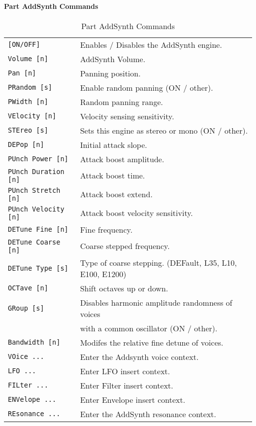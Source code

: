 \paragraph{Part AddSynth Commands}
\label{paragraph:command_line_part_addsynth_commands}
   \begin{table}[H]
      \centering
      \caption{Part AddSynth Commands}
      \label{table:yoshimi_part_addsynth_commands}
      \begin{tabular}{l l}
\texttt{[ON/OFF]} &
   Enables / Disables the AddSynth engine. \\
\texttt{Volume [n]} &
   AddSynth Volume.  \\
\texttt{Pan [n]} &
   Panning position.\\
\texttt{PRandom [s]} &
   Enable random panning (ON / other).\\
\texttt{PWidth [n]} &
   Random panning range.\\
\texttt{VElocity [n]} &
   Velocity sensing sensitivity. \\
\texttt{STEreo [s]} &
   Sets this engine as stereo or mono (ON / other). \\
\texttt{DEPop [n]} &
   Initial attack slope.   \\
\texttt{PUnch Power [n]} &
   Attack boost amplitude. \\
\texttt{PUnch Duration [n]} &
   Attack boost time.   \\
\texttt{PUnch Stretch [n]} &
   Attack boost extend. \\
\texttt{PUnch Velocity [n]} &
   Attack boost velocity sensitivity.  \\
\texttt{DETune Fine [n]} &
   Fine frequency.   \\
\texttt{DETune Coarse [n]} &
   Coarse stepped frequency.  \\
\texttt{DETune Type [s]} &
   Type of coarse stepping. (DEFault, L35, L10, E100, E1200)  \\
\texttt{OCTave [n]} &
   Shift octaves up or down.  \\
\texttt{GRoup [s]} &
   Disables harmonic amplitude randomness of voices \\
\texttt{ } &
             with a common oscillator (ON / other). \\
\texttt{Bandwidth [n]} &
   Modifes the relative fine detune of voices. \\
\texttt{VOice ...} &
   Enter the Addsynth voice context. \\
\texttt{LFO ...} &
   Enter LFO insert context.  \\
\texttt{FILter ...} &
   Enter Filter insert context.  \\
\texttt{ENVelope ...} &
   Enter Envelope insert context.   \\
\texttt{REsonance ...} &
   Enter the AddSynth resonance context. \\
      \end{tabular}
   \end{table}

